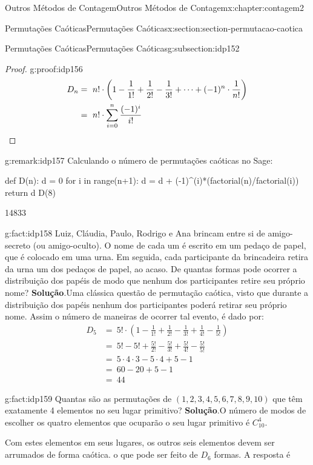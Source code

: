 \documentclass[oneside,10pt,]{book}
\newcommand{\blocktitlefont}{\relax}
\newcommand{\qedhere}{\relax}
\numberwithin{equation}{section}
\newcommand{\amp}{&}
\begin{document}
\begin{chapterptx}{Outros Métodos de Contagem}{}{Outros Métodos de Contagem}{}{}{x:chapter:contagem2}
\begin{sectionptx}{Permutações Caóticas}{}{Permutações Caóticas}{}{}{x:section:section-permutacao-caotica}
\begin{subsectionptx}{Permutações Caóticas}{}{Permutações Caóticas}{}{}{g:subsection:idp152}
\begin{proof}{}{g:proof:idp156}
\begin{align*}
D_n \amp = ~ n!\cdot\left(1-\dfrac{1}{1!}+\dfrac{1}{2!}-\dfrac{1}{3!}+\cdots+(-1)^n\cdot \dfrac{1}{n!}\right) \\
\amp = ~ n!\cdot\sum_{i=0}^{n}\dfrac{(-1)^i}{i!} \qedhere
\end{align*}
%
\end{proof}
\begin{remark}{}{g:remark:idp157}%
Calculando o número de permutações caóticas no Sage: \leavevmode%
\begin{sageinput}
def D(n):
    d = 0
    for i in range(n+1):
        d = d + (-1)^(i)*(factorial(n)/factorial(i))
    return d
D(8)
\end{sageinput}
\begin{sageoutput}
14833
\end{sageoutput}
\end{remark}
\begin{fact}{}{}{g:fact:idp158}%
Luiz, Cláudia, Paulo, Rodrigo e Ana brincam entre si de amigo-secreto (ou amigo-oculto). O nome de cada um é escrito em um pedaço de papel, que é colocado em uma urna. Em seguida, cada participante da brincadeira retira da urna um dos pedaços de papel, ao acaso. De quantas formas pode ocorrer a distribuição dos papéis de modo que nenhum dos participantes retire seu próprio nome?%
\textbf{\blocktitlefont Solução}.\quad{}Uma clássica questão de permutação caótica, visto que durante a distribuição dos papéis nenhum dos participantes poderá retirar seu próprio nome. Assim o número de maneiras de ocorrer tal evento, é dado por:%
\begin{align*}
D_5 \amp = ~5!\cdot\left(1-\frac{1}{1!}+\frac{1}{2!}-\frac{1}{3!}+\frac{1}{4!}-\frac{1}{5!}\right) \\
\amp =  ~5!-5! + \frac{5!}{2!} -\frac{5!}{3!} + \frac{5!}{4!}-\frac{5!}{5!} \\
\amp =  ~5\cdot 4 \cdot 3 -5\cdot 4 + 5 - 1 \\
\amp = ~60-20+5-1 \\
\amp =  ~44 
\end{align*}
%
\end{fact}
\begin{fact}{}{}{g:fact:idp159}%
Quantas são as permutações de \((1, 2, 3, 4, 5, 6, 7, 8, 9, 10)\) que têm exatamente 4 elementos no seu lugar primitivo?%
\textbf{\blocktitlefont Solução}.\quad{}O número de modos de escolher os quatro elementos que ocuparão o seu lugar primitivo é \(C_{10}^4\).%
\par
Com estes elementos em seus lugares, os outros seis elementos devem ser arrumados de forma caótica. o que pode ser feito de \(D_6\) formas. A resposta é%

\end{fact}
\end{subsectionptx}
\end{sectionptx}
\end{chapterptx}
\end{document}
